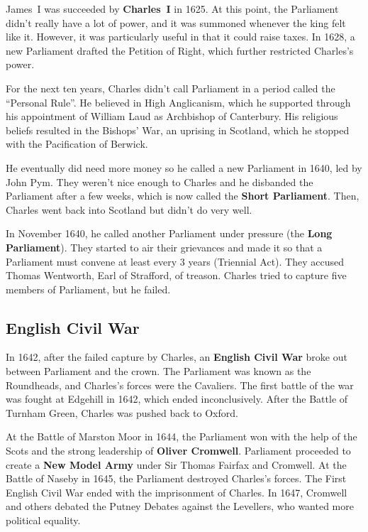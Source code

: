 James~I was succeeded by \textbf{Charles~I} in 1625.
At this point, the Parliament didn't really have a lot of power,
and it was summoned whenever the king felt like it.
However, it was particularly useful in that it could raise taxes.
In 1628, a new Parliament drafted the Petition of Right, which further restricted Charles's power.

For the next ten years, Charles didn't call Parliament in a period called the ``Personal Rule''.
He believed in High Anglicanism,
which he supported through his appointment of William Laud as Archbishop of Canterbury.
His religious beliefs resulted in the Bishops' War, an uprising in Scotland,
which he stopped with the Pacification of Berwick.

He eventually did need more money so he called a new Parliament in 1640, led by John Pym.
They weren't nice enough to Charles and he disbanded the Parliament after a few weeks,
which is now called the \textbf{Short Parliament}.
Then, Charles went back into Scotland but didn't do very well.

In November 1640, he called another Parliament under pressure (the \textbf{Long Parliament}).
They started to air their grievances
and made it so that a Parliament must convene at least every 3 years (Triennial Act).
They accused Thomas Wentworth, Earl of Strafford, of treason.
Charles tried to capture five members of Parliament, but he failed.

\subsection*{English Civil War}

In 1642, after the failed capture by Charles,
an \textbf{English Civil War} broke out between Parliament and the crown.
The Parliament was known as the Roundheads, and Charles's forces were the Cavaliers.
The first battle of the war was fought at Edgehill in 1642, which ended inconclusively.
After the Battle of Turnham Green, Charles was pushed back to Oxford.

At the Battle of Marston Moor in 1644, the Parliament won with the help of the Scots
and the strong leadership of \textbf{Oliver Cromwell}.
Parliament proceeded to create a \textbf{New Model Army} under Sir Thomas Fairfax and Cromwell.
At the Battle of Naseby in 1645, the Parliament destroyed Charles's forces.
The First English Civil War ended with the imprisonment of Charles.
In 1647, Cromwell and others debated the Putney Debates against the Levellers,
who wanted more political equality.

